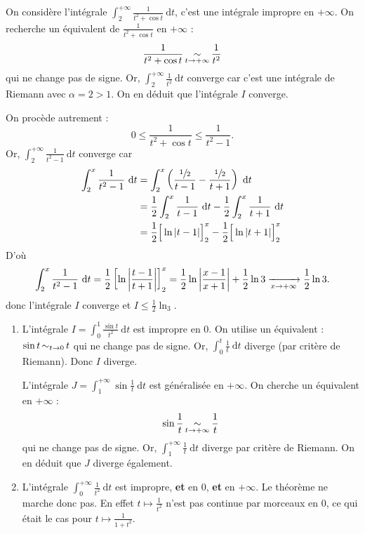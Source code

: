 \begin{exm}
	On considère l'intégrale $\int_{2}^{+\infty} \frac{1}{t^2+ \cos t}~\mathrm{d}t$, c'est une intégrale impropre en $+\infty$.
	On recherche un équivalent de $\frac{1}{t^2 + \cos t}$\/ en $+\infty$ : \[
		\frac{1}{t^2 + \cos t} \operatorname*{\sim}_{t\to +\infty} \frac{1}{t^2}
	\] qui ne change pas de signe. Or, $\int_{2}^{+\infty} \frac{1}{t^2}~\mathrm{d}t$\/ converge car c'est une intégrale de {\sc Riemann}\/ avec $\alpha = 2 > 1$.
	On en déduit que l'intégrale $I$\/ converge.

	On procède autrement : \[
		0 \le \frac{1}{t^2 + \cos t} \le \frac{1}{t^2 - 1}
	.\] Or, $\int_{2}^{+\infty} \frac{1}{t^2 - 1}~\mathrm{d}t$\/ converge car
	\begin{align*}
		\int_{2}^{x} \frac{1}{t^2 - 1}~\mathrm{d}t &= \int_{2}^{x} \left( \frac{\sfrac12}{t-1} - \frac{\sfrac12}{t+1} \right) ~\mathrm{d}t \\
		&= \frac{1}{2} \int_{2}^{x} \frac{1}{t-1}~\mathrm{d}t - \frac{1}{2}\int_{2}^{x} \frac{1}{t+1}~\mathrm{d}t \\
		&= \frac{1}{2} \Big[\ln|t-1|\Big]_2^x - \frac{1}{2}\Big[\ln |t+1|\Big]_2^x \\
	\end{align*}
	D'où \[
		\int_{2}^{x} \frac{1}{t^2 - 1}~\mathrm{d}t = \frac{1}{2} \left[ \ln\left| \frac{t-1}{t+1} \right| \right]_2^x = \frac{1}{2}\ln \left| \frac{x-1}{x+1} \right| + \frac{1}{2} \ln 3 \xrightarrow[x\to +\infty]{} \frac{1}{2} \ln 3
	.\] donc l'intégrale $I$\/ converge et $I \le \frac{1}{2} \ln_3$.
\end{exm}

\begin{exo}
	\begin{enumerate}
		\item L'intégrale $I = \int_{0}^{1} \frac{\sin t}{t^2}~\mathrm{d}t$\/ est impropre en 0. On utilise un équivalent : $\sin t \operatorname*{\sim}_{t\to 0} t$\/ qui ne change pas de signe. Or, $\int_{0}^{t} \frac{1}{t}~\mathrm{d}t$\/ diverge (par critère de {\sc Riemann}). Donc $I$\/ diverge.
			
			L'intégrale $J = \int_{1}^{+\infty} \sin \frac{1}{t}~\mathrm{d}t$\/ est généralisée en $+\infty$. On cherche un équivalent en $+\infty$\/ : \[
				\sin \frac{1}{t} \operatorname*{\sim}_{t\to +\infty} \frac{1}{t}
			\] qui ne change pas de signe. Or, $\int_{1}^{+\infty} \frac{1}{t}~\mathrm{d}t$\/ diverge par critère de {\sc Riemann}. On en déduit que $J$\/ diverge également.
		\item L'intégrale $\int_{0}^{+\infty} \frac{1}{t^2}~\mathrm{d}t$\/ est impropre, {\bf et}\/ en 0, {\bf et}\/ en $+\infty$. Le théorème ne marche donc pas.
			En effet $t\mapsto \frac{1}{t^2}$\/ n'est pas continue par morceaux en 0, ce qui était le cas pour $t\mapsto \frac{1}{1+t^2}$.
	\end{enumerate}
\end{exo}

